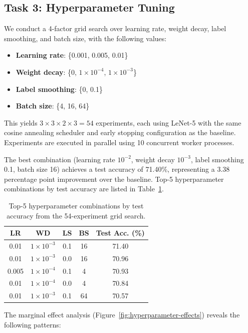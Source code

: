 \documentclass{article}
\begin{document}
\subsection{Task 3: Hyperparameter Tuning}\label{subsec:task-3}

We conduct a 4-factor grid search over learning rate, 
weight decay, label smoothing, and batch size, with the following values:
\begin{itemize}
  \item \textbf{Learning rate}: \{0.001, 0.005, 0.01\}
  \item \textbf{Weight decay}: \{0, $1\times10^{-4}$, $1\times10^{-3}$\}
  \item \textbf{Label smoothing}: \{0, 0.1\}
  \item \textbf{Batch size}: \{4, 16, 64\}
\end{itemize}
This yields $3 \times 3 \times 2 \times 3 = 54$ experiments, 
each using LeNet-5 with the same cosine annealing scheduler and early stopping configuration as the baseline. 
Experiments are executed in parallel using 10 concurrent worker processes.

The best combination (learning rate $10^{-2}$, weight decay $10^{-3}$, label smoothing 0.1, batch size 16) 
achieves a test accuracy of 71.40\%, representing a 3.38 percentage point improvement over the baseline.
Top-5 hyperparameter combinations by test accuracy are listed in Table~\ref{tab:task3-top5}.

\begin{table}[t]
  \centering
  \caption{Top-5 hyperparameter combinations by test accuracy from the 54-experiment grid search.}
  \label{tab:task3-top5}
  \begin{tabular}{ccccc}
    \toprule
    LR & WD & LS & BS & Test Acc. (\%) \\
    \midrule
    0.01  & $1\times10^{-3}$ & 0.1 & 16 & 71.40 \\
    0.01  & $1\times10^{-3}$ & 0.0 & 16 & 70.96 \\
    0.005 & $1\times10^{-4}$ & 0.1 &  4 & 70.93 \\
    0.01  & $1\times10^{-4}$ & 0.0 &  4 & 70.84 \\
    0.01  & $1\times10^{-3}$ & 0.1 & 64 & 70.57 \\
    \bottomrule
  \end{tabular}
\end{table}

The marginal effect analysis (Figure~\ref{fig:hyperparameter-effects}) reveals the following patterns:
\end{document}
